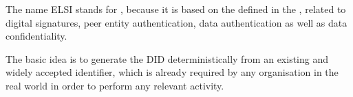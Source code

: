 \documentclass[a4paper,12pt,english]{sphinxhowto}
\begin{document}
\sphinxAtStartPar
The name ELSI stands for    , because it is based on the  defined in the , related to digital signatures, peer entity authentication, data authentication as well as data confidentiality.

\sphinxAtStartPar
The basic idea is to generate the DID deterministically from an existing and widely accepted identifier, which is already required by any organisation in the real world in order to perform any relevant activity.
\end{document}
